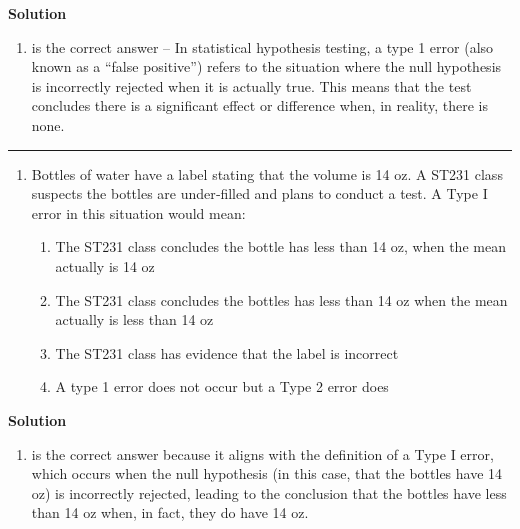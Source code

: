 \documentclass[
  letterpaper,
  DIV=11,
  numbers=noendperiod,
  oneside]{scrreprt}
\providecommand{\tightlist}{%
  \setlength{\itemsep}{0pt}\setlength{\parskip}{0pt}}\usepackage{longtable,booktabs,array}
\begin{document}
\textbf{Solution}

\begin{enumerate}
\def\labelenumi{(\alph{enumi})}
\setcounter{enumi}{1}
\tightlist
\item
  is the correct answer -- In statistical hypothesis testing, a type 1
  error (also known as a ``false positive'') refers to the situation
  where the null hypothesis is incorrectly rejected when it is actually
  true. This means that the test concludes there is a significant effect
  or difference when, in reality, there is none.
\end{enumerate}

\begin{center}\rule{0.5\linewidth}{0.5pt}\end{center}

\begin{enumerate}
\def\labelenumi{\arabic{enumi}.}
\setcounter{enumi}{1}
\tightlist
\item
  Bottles of water have a label stating that the volume is 14 oz. A
  ST231 class suspects the bottles are under‐filled and plans to conduct
  a test. A Type I error in this situation would mean:

  \begin{enumerate}
  \def\labelenumii{\alph{enumii}.}
  \tightlist
  \item
    The ST231 class concludes the bottle has less than 14 oz, when the
    mean actually is 14 oz
  \item
    The ST231 class concludes the bottles has less than 14 oz when the
    mean actually is less than 14 oz
  \item
    The ST231 class has evidence that the label is incorrect
  \item
    A type 1 error does not occur but a Type 2 error does
  \end{enumerate}
\end{enumerate}

\textbf{Solution}

\begin{enumerate}
\def\labelenumi{(\alph{enumi})}
\tightlist
\item
  is the correct answer because it aligns with the definition of a Type
  I error, which occurs when the null hypothesis (in this case, that the
  bottles have 14 oz) is incorrectly rejected, leading to the conclusion
  that the bottles have less than 14 oz when, in fact, they do have 14
  oz.
\end{enumerate}
\end{document}
